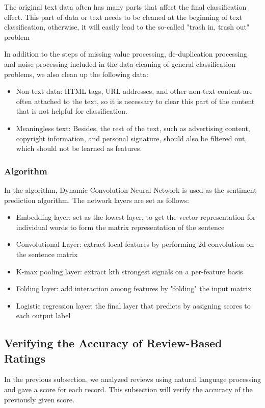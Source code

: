 \documentclass{mcmthesis}
\begin{document}
	
	The original text data often has many parts that affect the final classification effect. This part of data or text needs to be cleaned at the beginning of text classification, otherwise, it will easily lead to the so-called "trash in, trash out" problem\cite{2}
	
	In addition to the steps of missing value processing, de-duplication processing and noise processing included in the data cleaning of general classification problems, we also clean up the following data:
	\begin{itemize}
		\item Non-text data: HTML tags, URL addresses, and other non-text content are often attached to the text, so it is necessary to clear this part of the content that is not helpful for classification.
		\item Meaningless text: Besides, the rest of the text, such as advertising content, copyright information, and personal signature, should also be filtered out, which should not be learned as features.
	\end{itemize}
	\subsubsection{Algorithm}
	In the algorithm, Dynamic Convolution Neural Network is used as the sentiment prediction algorithm. The network layers are set as follows:
	\begin{itemize}
		\item Embedding layer: set as the lowest layer, to get the vector representation for individual words to form the matrix representation of the sentence
		\item Convolutional Layer: extract local features by performing 2d convolution on the sentence matrix
		\item K-max pooling layer: extract kth strongest signals on a per-feature basis
		\item Folding layer: add interaction among features by "folding" the input matrix
		\item Logistic regression layer: the final layer that predicts by assigning scores to each output label
	\end{itemize}
	
	
	\subsection{Verifying the Accuracy of Review-Based Ratings}
	In the previous subsection, we analyzed reviews using natural language processing and gave a score for each record. This subsection will verify the accuracy of the previously given score.
	
\end{document}
